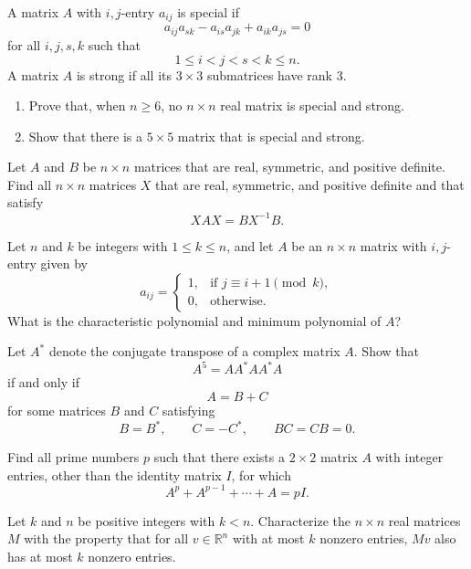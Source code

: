\documentclass[12pt]{article}
\begin{document}
\begin{problem}
A matrix $A$ with $i,j$-entry $a_{ij}$ is special if
\[
a_{ij}a_{sk}-a_{is}a_{jk}+a_{ik}a_{js}=0
\]
for all $i,j,s,k$ such that
\[
1\le i<j<s<k\le n.
\]
A matrix $A$ is strong if all its $3\times3$ submatrices have rank $3$.

\begin{enumerate}
    \item Prove that, when $n\ge6$, no $n\times n$ real matrix is special and strong.
    \item Show that there is a $5\times5$ matrix that is special and strong.
\end{enumerate}
\end{problem}

\begin{problem}
Let $A$ and $B$ be $n\times n$ matrices that are real, symmetric, and positive definite.
Find all $n\times n$ matrices $X$ that are real, symmetric, and positive definite and that
satisfy
\[
XAX=BX^{-1}B.
\]
\end{problem}

\begin{problem}
Let $n$ and $k$ be integers with $1\le k\le n$, and let $A$ be an $n\times n$ matrix
with $i,j$-entry given by
\[
a_{ij}=
\begin{cases}
1, & \text{if } j\equiv i+1\pmod{k},\\
0, & \text{otherwise}.
\end{cases}
\]
What is the characteristic polynomial and minimum polynomial of $A$?
\end{problem}

\begin{problem}
Let $A^*$ denote the conjugate transpose of a complex matrix $A$. Show that
\[
A^5=AA^*AA^*A
\]
if and only if
\[
A=B+C
\]
for some matrices $B$ and $C$ satisfying
\[
B=B^*,\qquad C=-C^*,\qquad BC=CB=0.
\]
\end{problem}

\begin{problem}
Find all prime numbers $p$ such that there exists a $2\times2$ matrix $A$ with integer
entries, other than the identity matrix $I$, for which
\[
A^p+A^{p-1}+\cdots+A=pI.
\]
\end{problem}

\begin{problem}
Let $k$ and $n$ be positive integers with $k<n$. Characterize the $n\times n$ real matrices
$M$ with the property that for all $v\in\mathbb R^n$ with at most $k$ nonzero entries,
$Mv$ also has at most $k$ nonzero entries.
\end{problem}
\end{document}
